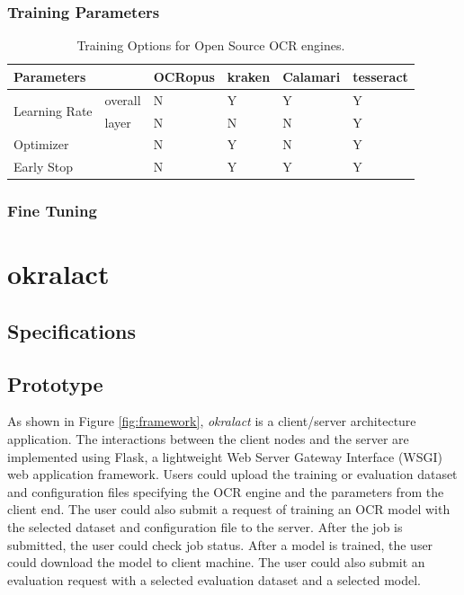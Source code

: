 \documentclass[conference]{IEEEtran}
\begin{document}
\subsubsection*{Training Parameters}

\begin{table}[bt]
\begin{tabular}{llllll}
\hline
Parameters & & OCRopus     & kraken                      & Calamari & tesseract\\ \hline
\multirow{2}{*}{Learning Rate}& overall & N & Y & Y & Y\\ 
&layer & N & N  & N & Y \\
\hline
Optimizer &  &  N & Y & N & Y \\\hline
Early Stop & & N & Y & Y & Y \\
\end{tabular}
\caption{Training Options for Open Source OCR engines.}
\label{tab:training_options}
\end{table}
\subsubsection*{Fine Tuning}
\section*{okralact}

\subsection*{Specifications}


\subsection*{Prototype}     

As shown in Figure \ref{fig:framework}, \textit{okralact} is a client/server    
architecture application. The interactions between the client nodes and the     
server are implemented using Flask, a lightweight Web Server Gateway Interface   
(WSGI) web application framework. Users could upload the training or evaluation 
dataset and configuration files specifying the OCR engine and the parameters    
from the client end. The user could also submit a request of training an OCR    
model with the selected dataset and configuration file to the server. After the 
job is submitted, the user could check job status. After a model is trained,    
the user could download the model to client machine. The user could also submit 
an evaluation request with a selected evaluation dataset and a selected model.
\end{document}

